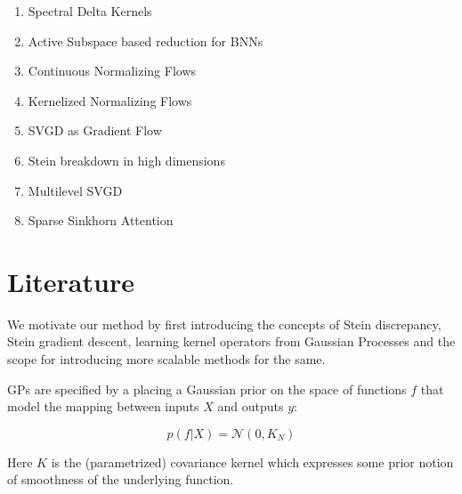 \documentclass[12pt]{article}
\renewcommand{\[}{\left[}
\renewcommand{\]}{\right]}
\renewcommand{\(}{\left(}
\renewcommand{\)}{\right)}
\begin{document}
\begin{enumerate}
    \item Spectral Delta Kernels \cite{lazaro-gredilla_sparse_2010}

    \item Active Subspace based reduction for BNNs \cite{jantre_learning_2023}

    \item Continuous Normalizing Flows \cite{grathwohl_ffjord_2018}

    \item Kernelized Normalizing Flows \cite{english_kernelised_2024}

    \item SVGD as Gradient Flow \cite{liu_stein_2017}

    \item Stein breakdown in high dimensions \cite{ba_towards_2019}


    \item Multilevel SVGD \cite{alsup_multilevel_2022}

    \item Sparse Sinkhorn Attention \cite{tay_sparse_2020}
\end{enumerate}

\section{Literature}
We motivate our method by first introducing the concepts of Stein discrepancy, Stein gradient descent, learning kernel operators from Gaussian Processes and the scope for introducing more scalable methods for the same. 

GPs are specified by a placing a Gaussian prior on the space of functions $f$ that model the mapping between inputs $X$ and outputs $y$:

$$p(f | X) = \mathcal{N}(0, K_N)$$

Here $K$ is the (parametrized) covariance kernel which expresses some prior notion of smoothness of the underlying function.
\end{document}
